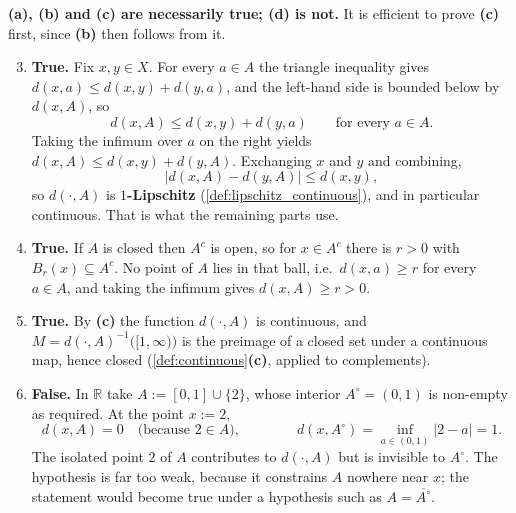 \begin{exercisesolution}
\label{sol:distance_from_set_multiple_choice}
\textbf{(a), (b) and (c) are necessarily true; (d) is not.} It is efficient to prove
\textbf{(c)} first, since \textbf{(b)} then follows from it.

\begin{enumerate}[label=\textbf{(\alph*)}]
  \setcounter{enumi}{2}
  \item \textbf{True.} Fix $x,y \in X$. For every $a \in A$ the triangle inequality gives
    $d(x,a) \leq d(x,y) + d(y,a)$, and the left-hand side is bounded below by $d(x,A)$, so
    \[d(x,A) \leq d(x,y) + d(y,a) \qquad\text{for every } a \in A.\]
    Taking the infimum over $a$ on the right yields $d(x,A) \leq d(x,y) + d(y,A)$. Exchanging
    $x$ and $y$ and combining,
    \[\big|d(x,A) - d(y,A)\big| \leq d(x,y),\]
    so $d(\cdot,A)$ is \textbf{$1$-Lipschitz} (\cref{def:lipschitz_continuous}), and in
    particular continuous. That is what the remaining parts use.
  \setcounter{enumi}{0}
  \item \textbf{True.} If $A$ is closed then $A^c$ is open, so for $x \in A^c$ there is $r>0$
    with $B_r(x) \subseteq A^c$. No point of $A$ lies in that ball, i.e.\ $d(x,a) \geq r$ for
    every $a \in A$, and taking the infimum gives $d(x,A) \geq r > 0$.
  \item \textbf{True.} By \textbf{(c)} the function $d(\cdot,A)$ is continuous, and
    $M = d(\cdot,A)^{-1}\big([1,\infty)\big)$ is the preimage of a closed set under a continuous
    map, hence closed (\cref{def:continuous}\textbf{(c)}, applied to complements).
  \setcounter{enumi}{3}
  \item \textbf{False.} In $\mathbb{R}$ take $A := [0,1]\cup\{2\}$, whose interior
    $A^\circ = (0,1)$ is non-empty as required. At the point $x := 2$,
    \[d(x,A) = 0 \quad\text{(because } 2 \in A\text{)}, \qquad\qquad
      d(x,A^\circ) = \inf_{a\in(0,1)}|2-a| = 1.\]
    The isolated point $2$ of $A$ contributes to $d(\cdot,A)$ but is invisible to $A^\circ$. The
    hypothesis  is far too weak, because it constrains $A$ nowhere
    near $x$; the statement would become true under a hypothesis such as
    $A = \overline{A^\circ}$.
\end{enumerate}
\end{exercisesolution}

